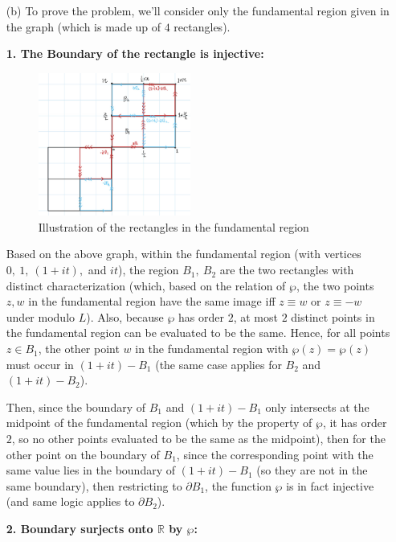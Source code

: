 \documentclass{article}
\begin{document}
\begin{itemize}
    \hfil

    \item[(b)] To prove the problem, we'll consider only the fundamental region given in the graph (which is made up of $4$ rectangles).

    \textbf{1. The Boundary of the rectangle is injective:}
    
    \begin{figure}[h!]
        \begin{center}
            \includegraphics*[width=50mm]{image 1.jpg}
            \caption{Illustration of the rectangles in the fundamental region}
        \end{center}
    \end{figure}

    Based on the above graph, within the fundamental region (with vertices $0,\ 1,\ (1+it),$ and $it$), the region $B_1,\ B_2$ are the two rectangles with distinct characterization (which, based on the relation of $\wp$, the two points $z,w$ in the fundamental region have the same image iff $z\equiv w$ or $z\equiv -w$ under modulo $L$). Also, because $\wp$ has order $2$, at most $2$ distinct points in the fundamental region can be evaluated to be the same. Hence, for all points $z\in B_1$, the other point $w$ in the fundamental region with $\wp(z)=\wp(z)$ must occur in $(1+it)-B_1$ (the same case applies for $B_2$ and $(1+it)-B_2$).

    Then, since the boundary of $B_1$ and $(1+it)-B_1$ only intersects at the midpoint of the fundamental region (which by the property of $\wp$, it has order $2$, so no other points evaluated to be the same as the midpoint), then for the other point on the boundary of $B_1$, since the corresponding point with the same value lies in the boundary of $(1+it)-B_1$ (so they are not in the same boundary), then restricting to $\partial B_1$, the function $\wp$ is in fact injective (and same logic applies to $\partial B_2$).

    \hfil

    \textbf{2. Boundary surjects onto $\mathbb{R}$ by $\wp$:}


\end{itemize}
\end{document}
